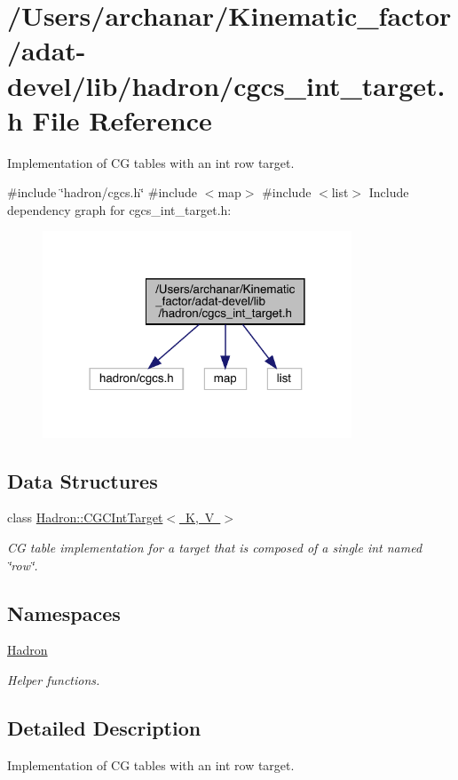 \hypertarget{adat-devel_2lib_2hadron_2cgcs__int__target_8h}{}\section{/\+Users/archanar/\+Kinematic\+\_\+factor/adat-\/devel/lib/hadron/cgcs\+\_\+int\+\_\+target.h File Reference}
\label{adat-devel_2lib_2hadron_2cgcs__int__target_8h}


Implementation of CG tables with an int row target.  


{\ttfamily \#include \char`\"{}hadron/cgcs.\+h\char`\"{}}\newline
{\ttfamily \#include $<$map$>$}\newline
{\ttfamily \#include $<$list$>$}\newline
Include dependency graph for cgcs\+\_\+int\+\_\+target.\+h\+:
\nopagebreak
\begin{figure}[H]
\begin{center}
\leavevmode
\includegraphics[width=261pt]{de/d95/adat-devel_2lib_2hadron_2cgcs__int__target_8h__incl}
\end{center}
\end{figure}
\subsection*{Data Structures}
\begin{DoxyCompactItemize}
\item 
class \mbox{\hyperlink{classHadron_1_1CGCIntTarget}{Hadron\+::\+C\+G\+C\+Int\+Target$<$ K, V $>$}}
\begin{DoxyCompactList}\small\item\em CG table implementation for a target that is composed of a single int named \char`\"{}row\char`\"{}. \end{DoxyCompactList}\end{DoxyCompactItemize}
\subsection*{Namespaces}
\begin{DoxyCompactItemize}
\item 
 \mbox{\hyperlink{namespaceHadron}{Hadron}}
\begin{DoxyCompactList}\small\item\em Helper functions. \end{DoxyCompactList}\end{DoxyCompactItemize}


\subsection{Detailed Description}
Implementation of CG tables with an int row target. 

